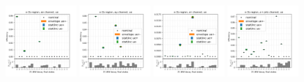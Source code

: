 \begin{figure}
    \includegraphics[width=0.24\textwidth]{chapters/Appendix/sectionTTSyst/figures/afterCorr/icata2_ch0_ue.png}
    \includegraphics[width=0.24\textwidth]{chapters/Appendix/sectionTTSyst/figures/afterCorr/icata2_ch1_ue.png}
    \includegraphics[width=0.24\textwidth]{chapters/Appendix/sectionTTSyst/figures/afterCorr/icata2_ch2_ue.png}
    \includegraphics[width=0.24\textwidth]{chapters/Appendix/sectionTTSyst/figures/afterCorr/icata2_ch3_ue.png}


\end{figure}

